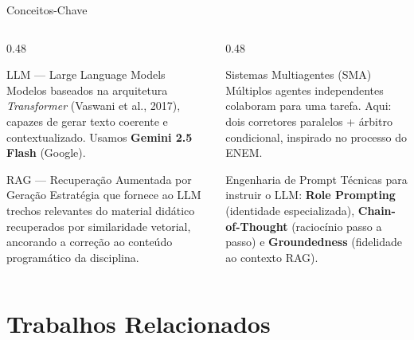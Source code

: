 \documentclass[10pt,aspectratio=169]{beamer}
\begin{document}
\begin{frame}{Conceitos-Chave}
  \begin{columns}[T]
    \begin{column}{0.48\textwidth}
      \begin{block}{LLM --- Large Language Models}
        Modelos baseados na arquitetura \textit{Transformer} (Vaswani et al., 2017), capazes de gerar texto coerente e contextualizado. Usamos \textbf{Gemini 2.5 Flash} (Google).
      \end{block}
      \vspace{0.4em}
      \begin{block}{RAG --- Recuperação Aumentada por Geração}
        Estratégia que fornece ao LLM trechos relevantes do material didático recuperados por similaridade vetorial, ancorando a correção ao conteúdo programático da disciplina.
      \end{block}
    \end{column}
    \begin{column}{0.48\textwidth}
      \begin{block}{Sistemas Multiagentes (SMA)}
        Múltiplos agentes independentes colaboram para uma tarefa. Aqui: dois corretores paralelos + árbitro condicional, inspirado no processo do ENEM.
      \end{block}
      \vspace{0.4em}
      \begin{block}{Engenharia de Prompt}
        Técnicas para instruir o LLM: \textbf{Role Prompting} (identidade especializada), \textbf{Chain-of-Thought} (raciocínio passo a passo) e \textbf{Groundedness} (fidelidade ao contexto RAG).
      \end{block}
    \end{column}
  \end{columns}
\end{frame}

\section{Trabalhos Relacionados}
\end{document}

